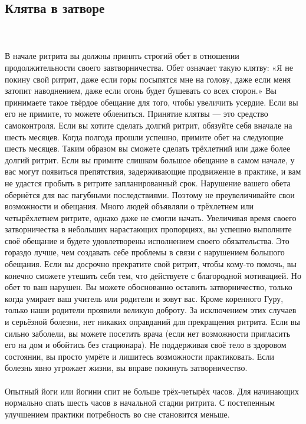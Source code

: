 \subsection{Клятва в затворе}
\\ \\ В начале ритрита вы должны принять строгий обет в отношении продолжительности своего завтворничества. Обет означает такую клятву: «Я не покину свой ритрит, даже если горы посыпятся мне на голову, даже если меня затопит наводнением, даже если огонь будет бушевать со всех сторон.» Вы принимаете такое твёрдое обещание для того, чтобы увеличить усердие. Если вы его не примите, то можете облениться. Принятие клятвы — это средство самоконтроля. Если вы хотите сделать долгий ритрит, обязуйте себя вначале на шесть месяцев. Когда полгода прошли успешно, примите обет на следующие шесть месяцев. Таким образом вы сможете сделать трёхлетний или даже более долгий ритрит. Если вы примите слишком большое обещание в самом начале, у вас могут появиться препятствия, задерживающие продвижение в практике, и вам не удастся пробыть в ритрите запланированный срок. Нарушение вашего обета обернётся для вас пагубными последствиями. Поэтому не преувеличивайте свои возможности и обещания. Много людей объявляли о трёхлетнем или четырёхлетнем ритрите, однако даже не смогли начать. Увеличивая время своего затворничества в небольших нарастающих пропорциях, вы успешно выполните своё обещание и будете удовлетворены исполнением своего обязательства. Это гораздо лучше, чем создавать себе проблемы в связи с нарушением большого обещания. Если вы досрочно прекратите свой ритрит, чтобы кому-то помочь, вы конечно сможете утешить себя тем, что действуете с благородной мотивацией. Но обет то ваш нарушен. Вы можете обоснованно оставить затворничество, только когда умирает ваш учитель или родители и зовут вас. Кроме коренного Гуру, только наши родители проявили великую доброту. За исключением этих случаев и серьёзной болезни, нет никаких оправданий для прекращения ритрита. Если вы сильно заболели, вы можете посетить врача (если нет возможности пригласить его на дом и обойтись без стационара). Не поддерживая своё тело в здоровом состоянии, вы просто умрёте и лишитесь возможности практиковать. Если болезнь явно угрожает жизни, вы вправе покинуть затворничество.
\\ \\ Опытный йоги или йогини спит не больше трёх-четырёх часов. Для начинающих нормально спать шесть часов в начальной стадии ритрита. С постепенным улучшением практики потребность во сне становится меньше.
